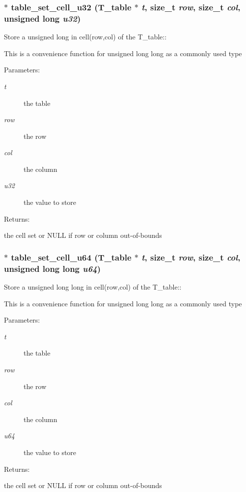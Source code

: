 \subsubsection{$\ast$ table\_\-set\_\-cell\_\-u32 ({\bf T\_\-table} $\ast$ {\em t}, size\_\-t {\em row}, size\_\-t {\em col}, unsigned long {\em u32})}\label{group__simple__table_a11}


Store a unsigned long in cell(row,col) of the T\_\-table::

This is a convenience function for unsigned long long as a commonly used type\begin{Desc}
\item[Parameters: ]\par
\begin{description}
\item[{\em 
t}]the table \item[{\em 
row}]the row \item[{\em 
col}]the column \item[{\em 
u32}]the value to store\end{description}
\end{Desc}
\begin{Desc}
\item[Returns: ]\par
the cell set or NULL if row or column out-of-bounds \end{Desc}
\subsubsection{$\ast$ table\_\-set\_\-cell\_\-u64 ({\bf T\_\-table} $\ast$ {\em t}, size\_\-t {\em row}, size\_\-t {\em col}, unsigned long long {\em u64})}\label{group__simple__table_a10}


Store a unsigned long long in cell(row,col) of the T\_\-table::

This is a convenience function for unsigned long long as a commonly used type\begin{Desc}
\item[Parameters: ]\par
\begin{description}
\item[{\em 
t}]the table \item[{\em 
row}]the row \item[{\em 
col}]the column \item[{\em 
u64}]the value to store\end{description}
\end{Desc}
\begin{Desc}
\item[Returns: ]\par
the cell set or NULL if row or column out-of-bounds \end{Desc}
